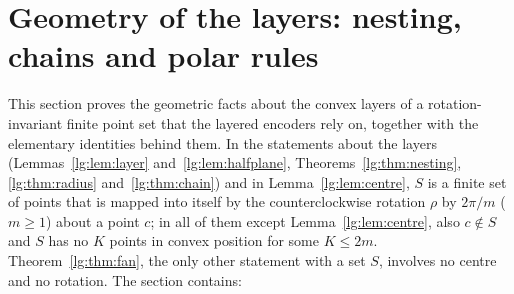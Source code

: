 \section{Geometry of the layers: nesting, chains and polar rules}\label{lg:sec}

This section proves the geometric facts about the convex layers of a rotation-invariant finite point set that the
layered encoders rely on, together with the elementary identities behind them. In the statements about the layers
(Lemmas~\ref{lg:lem:layer} and~\ref{lg:lem:halfplane}, Theorems~\ref{lg:thm:nesting}, \ref{lg:thm:radius}
and~\ref{lg:thm:chain}) and in Lemma~\ref{lg:lem:centre}, $S$ is a finite set of points that is mapped into itself by
the counterclockwise rotation $\rho$ by $2\pi/m$ ($m\ge1$) about a point $c$; in all of them except
Lemma~\ref{lg:lem:centre}, also $c\notin S$ and $S$ has no $K$ points in convex position for some $K\le 2m$.
Theorem~\ref{lg:thm:fan}, the only other statement with a set $S$, involves no centre and no rotation. The section
contains:
